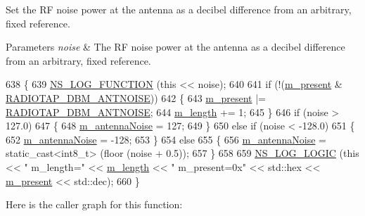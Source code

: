 Set the RF noise power at the antenna as a decibel difference from an arbitrary, fixed reference. 


\begin{DoxyParams}{Parameters}
{\em noise} & The RF noise power at the antenna as a decibel difference from an arbitrary, fixed reference. \\
\hline
\end{DoxyParams}

\begin{DoxyCode}
638 \{
639   \hyperlink{log-macros-disabled_8h_a90b90d5bad1f39cb1b64923ea94c0761}{NS\_LOG\_FUNCTION} (\textcolor{keyword}{this} << noise);
640 
641   \textcolor{keywordflow}{if} (!(\hyperlink{classns3_1_1RadiotapHeader_a8b8aca212245ad4ad1aa796d4cc802bb}{m\_present} & \hyperlink{classns3_1_1RadiotapHeader_afd15dfe66387dfbcbf62865d024f58ffae23bc8a9f7c31fed309f83d9fb47303e}{RADIOTAP\_DBM\_ANTNOISE}))
642     \{
643       \hyperlink{classns3_1_1RadiotapHeader_a8b8aca212245ad4ad1aa796d4cc802bb}{m\_present} |= \hyperlink{classns3_1_1RadiotapHeader_afd15dfe66387dfbcbf62865d024f58ffae23bc8a9f7c31fed309f83d9fb47303e}{RADIOTAP\_DBM\_ANTNOISE};
644       \hyperlink{classns3_1_1RadiotapHeader_a6894ef017e95e58463eac5e435507a33}{m\_length} += 1;
645     \}
646   \textcolor{keywordflow}{if} (noise > 127.0)
647     \{
648       \hyperlink{classns3_1_1RadiotapHeader_aff9eb044c000563934b7b88edad4ef17}{m\_antennaNoise} = 127;
649     \}
650   \textcolor{keywordflow}{else} \textcolor{keywordflow}{if} (noise < -128.0)
651     \{
652       \hyperlink{classns3_1_1RadiotapHeader_aff9eb044c000563934b7b88edad4ef17}{m\_antennaNoise} = -128;
653     \}
654   \textcolor{keywordflow}{else}
655     \{
656       \hyperlink{classns3_1_1RadiotapHeader_aff9eb044c000563934b7b88edad4ef17}{m\_antennaNoise} = \textcolor{keyword}{static\_cast<}int8\_t\textcolor{keyword}{>} (floor (noise + 0.5));
657     \}
658 
659   \hyperlink{group__logging_ga88acd260151caf2db9c0fc84997f45ce}{NS\_LOG\_LOGIC} (\textcolor{keyword}{this} << \textcolor{stringliteral}{" m\_length="} << \hyperlink{classns3_1_1RadiotapHeader_a6894ef017e95e58463eac5e435507a33}{m\_length} << \textcolor{stringliteral}{" m\_present=0x"} << std::hex << 
      \hyperlink{classns3_1_1RadiotapHeader_a8b8aca212245ad4ad1aa796d4cc802bb}{m\_present} << std::dec);
660 \}
\end{DoxyCode}


Here is the caller graph for this function\+:


